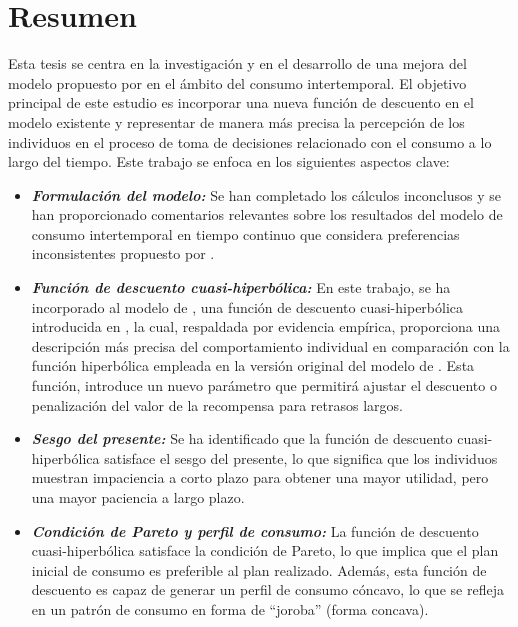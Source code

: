 \chapter*{Resumen}


Esta tesis se centra en la investigación y en el desarrollo de una mejora del modelo propuesto por \textcite{feigenbaum2021deviation} en el ámbito del consumo intertemporal. El objetivo principal de este estudio es incorporar una nueva función de descuento en el modelo existente y representar de manera más precisa la percepción de los individuos en el proceso de toma de decisiones relacionado con el consumo a lo largo del tiempo.
Este trabajo se enfoca en los siguientes aspectos clave:

\begin{itemize}
\item \textit{\textbf{Formulación del modelo:}} Se han completado los cálculos inconclusos y se han proporcionado comentarios relevantes sobre los resultados del modelo de consumo intertemporal en tiempo continuo que considera preferencias inconsistentes propuesto por \textcite{feigenbaum2021deviation}. 


\item \textit{\textbf{Función de descuento cuasi-hiperbólica:}} En este trabajo, se ha incorporado al modelo de \textcite{feigenbaum2021deviation}, una función de descuento cuasi-hiperbólica introducida en \parencite{myerson1995discounting}, la cual, respaldada por evidencia empírica, proporciona una descripción más precisa del comportamiento individual en comparación con la función hiperbólica empleada en la versión original del modelo de \textcite{feigenbaum2021deviation}. Esta función, introduce un nuevo parámetro que permitirá ajustar el descuento o penalización del valor de la recompensa para retrasos largos.

\item  \textit{\textbf{Sesgo del presente:}} Se ha identificado que la función de descuento cuasi-hiperbólica satisface el sesgo del presente, lo que significa que los individuos muestran impaciencia a corto plazo para obtener una mayor utilidad, pero una mayor paciencia a largo plazo.

\item  \textit{\textbf{Condición de Pareto y perfil de consumo:}} La función de descuento cuasi-hiperbólica satisface la condición de Pareto, lo que implica que el plan inicial de consumo es preferible al plan realizado. Además, esta función de descuento es capaz de generar un perfil de consumo cóncavo, lo que se refleja en un patrón de consumo en forma de “joroba” (forma concava).

%
\end{itemize}


\hspace{1cm}














